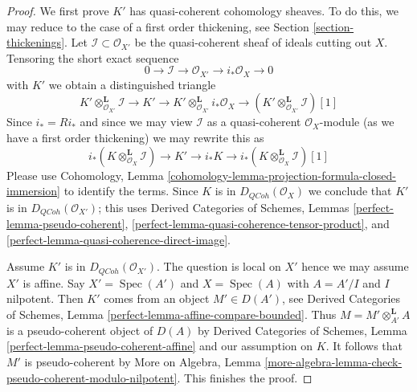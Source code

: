 \documentclass[10pt,a4paper]{amsart}
\theoremstyle{plain}
\theoremstyle{definition}
\theoremstyle{remark}
\numberwithin{equation}{subsection}
\def\Spec{\mathop{\mathrm{Spec}}}
\def\QCoh{\mathit{QCoh}}
\begin{document}
\begin{proof}
We first prove $K'$ has quasi-coherent cohomology sheaves.
To do this, we may reduce to the case of a first order thickening, see
Section \ref{section-thickenings}. Let $\mathcal{I} \subset \mathcal{O}_{X'}$
be the quasi-coherent sheaf of ideals cutting out $X$.
Tensoring the short exact sequence
$$
0 \to \mathcal{I} \to \mathcal{O}_{X'} \to i_*\mathcal{O}_X \to 0
$$
with $K'$ we obtain a distinguished triangle
$$
K' \otimes_{\mathcal{O}_{X'}}^\mathbf{L} \mathcal{I}
\to K' \to
K' \otimes_{\mathcal{O}_{X'}}^\mathbf{L} i_*\mathcal{O}_X
\to
(K' \otimes_{\mathcal{O}_{X'}}^\mathbf{L} \mathcal{I})[1]
$$
Since $i_* = Ri_*$ and since we may view $\mathcal{I}$
as a quasi-coherent $\mathcal{O}_X$-module (as we have a first
order thickening) we may rewrite this as
$$
i_*(K \otimes_{\mathcal{O}_X}^\mathbf{L} \mathcal{I})
\to K' \to
i_*K \to
i_*(K \otimes_{\mathcal{O}_X}^\mathbf{L} \mathcal{I})[1]
$$
Please use Cohomology, Lemma
\ref{cohomology-lemma-projection-formula-closed-immersion}
to identify the terms. Since $K$ is in
$D_\QCoh(\mathcal{O}_X)$ we conclude that
$K'$ is in $D_\QCoh(\mathcal{O}_{X'})$; this uses
Derived Categories of Schemes, Lemmas
\ref{perfect-lemma-pseudo-coherent},
\ref{perfect-lemma-quasi-coherence-tensor-product}, and
\ref{perfect-lemma-quasi-coherence-direct-image}.

\medskip\noindent
Assume $K'$ is in $D_\QCoh(\mathcal{O}_{X'})$.
The question is local on $X'$ hence we may assume $X'$ is affine.
Say $X' = \Spec(A')$ and $X = \Spec(A)$ with $A = A'/I$ and $I$ nilpotent.
Then $K'$ comes from an object $M' \in D(A')$, see
Derived Categories of Schemes, Lemma
\ref{perfect-lemma-affine-compare-bounded}.
Thus $M = M' \otimes_{A'}^\mathbf{L} A$ is a pseudo-coherent
object of $D(A)$ by Derived Categories of Schemes,
Lemma \ref{perfect-lemma-pseudo-coherent-affine} and our assumption on $K$.
It follows that $M'$ is pseudo-coherent by
More on Algebra, Lemma
\ref{more-algebra-lemma-check-pseudo-coherent-modulo-nilpotent}.
This finishes the proof.
\end{proof}
\end{document}
